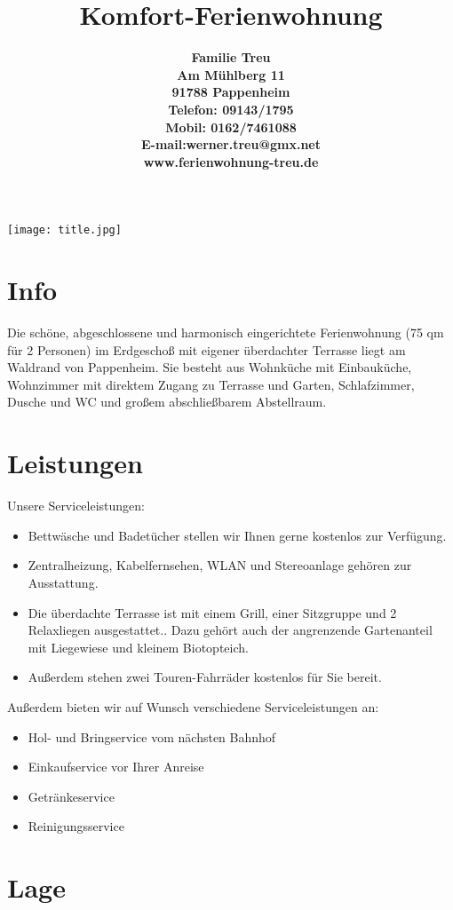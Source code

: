 \documentclass[10pt,foldmark,notumble]{leaflet}
\title{\bf Komfort-Ferienwohnung}
\author{%
\Large \bf Familie Treu \\
Am M\"uhlberg 11 \\
91788 Pappenheim \\
Telefon: 09143/1795 \\
Mobil: 0162/7461088 \\
E-mail:werner.treu@gmx.net \\
www.ferienwohnung-treu.de
}
\date{}
\begin{document}
\maketitle

\begin{center}
\texttt{[image: title.jpg]}
\end{center}

\section{Info} 
Die schöne, abgeschlossene und harmonisch
eingerichtete Ferienwohnung (75 qm für
2 Personen) im Erdgeschoß mit eigener
überdachter Terrasse liegt am Waldrand von
Pappenheim.
Sie besteht aus Wohnküche mit Einbauküche,
Wohnzimmer mit direktem Zugang zu Terrasse
und Garten, Schlafzimmer, Dusche und WC
und großem abschließbarem Abstellraum.

\section{Leistungen} 

Unsere Serviceleistungen:

\begin{itemize}
\item Bettwäsche und Badetücher stellen wir Ihnen gerne kostenlos zur Verfügung.
\item Zentralheizung, Kabelfernsehen, WLAN und Stereoanlage gehören zur Ausstattung.
\item Die überdachte Terrasse ist mit einem Grill, einer Sitzgruppe und 2 Relaxliegen ausgestattet.. Dazu
      gehört auch der angrenzende Gartenanteil mit Liegewiese und kleinem Biotopteich.
\item Außerdem stehen zwei Touren-Fahrräder kostenlos für Sie bereit.
\end{itemize}

Außerdem bieten wir auf Wunsch verschiedene
Serviceleistungen an:

\begin{itemize}
\item Hol- und Bringservice vom nächsten Bahnhof
\item Einkaufservice vor Ihrer Anreise
\item Getränkeservice
\item Reinigungsservice
\end{itemize}

\section{Lage}
\end{document}
